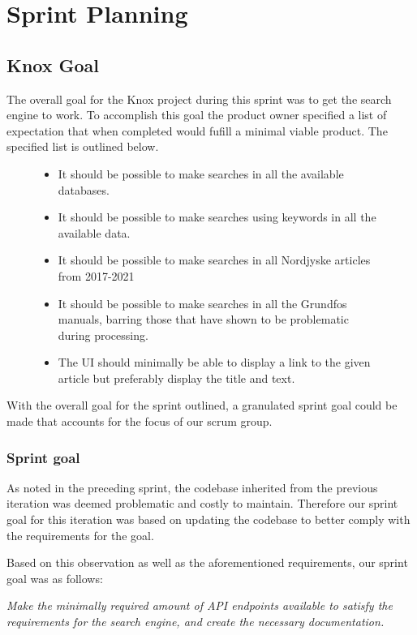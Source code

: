 \section{Sprint Planning}
\subsection{Knox Goal}
The overall goal for the Knox project during this sprint was to get the search engine to work. To accomplish this goal the product owner specified a list of expectation that when completed would fufill a minimal viable product. The specified list is outlined below.
\begin{figure}
\label{sprint3Goal}
\begin{itemize}
	\item It should be possible to make searches in all the available databases.
	\item It should be possible to make searches using keywords in all the available data.
	\item It should be possible to make searches in all Nordjyske articles from 2017-2021
	\item It should be possible to make searches in all the Grundfos manuals, barring those that have shown to be problematic during processing.
	\item The UI should minimally be able to display a link to the given article but preferably display the title and text.
\end{itemize}
\end{figure}
With the overall goal for the sprint outlined, a granulated sprint goal could be made that accounts for the focus of our scrum group.

\subsubsection{Sprint goal}
As noted in the preceding sprint, the codebase inherited from the previous iteration was deemed problematic and costly to maintain. 
Therefore our sprint goal for this iteration was based on updating the codebase to better comply with the requirements for the \knox{} goal.


Based on this observation as well as the aforementioned requirements, our sprint goal was as follows:
\vspace{\baselineskip}

\textit{Make the minimally required amount of API endpoints available to satisfy the requirements for the search engine, and create the necessary documentation.}

